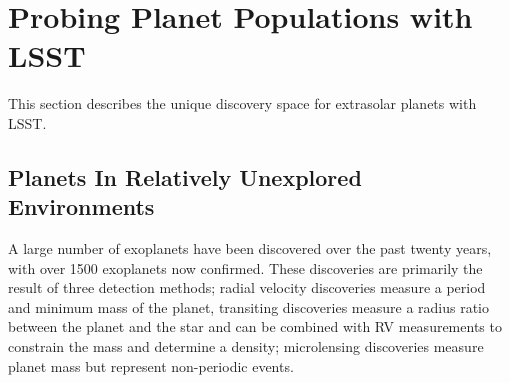 
%
%
%
%
%
%

\section{Probing Planet Populations with LSST}
\def\secname{planets}\label{sec:\secname}



This section describes the unique discovery space for extrasolar planets with LSST.

\subsection{Planets In Relatively Unexplored Environments}
A large number of exoplanets have been discovered over the past twenty years, with over 1500 exoplanets now confirmed. These discoveries are primarily the result of three detection methods; radial velocity discoveries measure a period and minimum mass of the planet, transiting discoveries measure a radius ratio between the planet and the star and can be combined with RV measurements to constrain the mass and determine a density; microlensing discoveries measure planet mass but represent non-periodic events.


